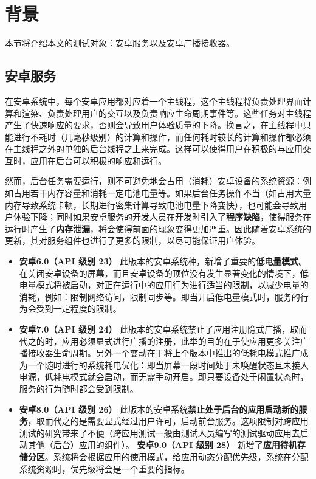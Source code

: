 \chapter{背景}\label{chapter_background}

本节将介绍本文的测试对象：安卓服务以及安卓广播接收器。
\section{安卓服务}

在安卓系统中，每个安卓应用都对应着一个主线程，这个主线程将负责处理界面计算和渲染、负责处理用户的交互以及负责响应生命周期事件等。这些任务对主线程产生了快速响应的要求，否则会导致用户体验质量的下降。换言之，在主线程中只能进行不耗时（几毫秒级别）的计算和操作，而任何耗时较长的计算和操作都必须在主线程之外的单独的后台线程之上来完成。这样可以使得用户在积极的与应用交互时，应用在后台可以积极的响应和运行。

然而，后台任务需要运行，则不可避免地会占用（消耗）安卓设备的系统资源：例如占用若干内存容量和消耗一定电池电量等。如果后台任务操作不当（如占用大量内存导致系统卡顿，长期进行密集计算导致电池电量下降变快），也可能会导致用户体验下降；同时如果安卓服务的开发人员在开发时引入了\textbf{程序缺陷}，使得服务在运行时产生了\textbf{内存泄漏}，将会使得前面的现象变得更加严重。因此随着安卓系统的更新，其对服务组件也进行了更多的限制，以尽可能保证用户体验。

\begin{itemize}
	\item \textbf{安卓6.0（API 级别 23） } 此版本的安卓系统种，新增了重要的\textbf{低电量模式}。在关闭安卓设备的屏幕，而且安卓设备的顶位没有发生显著变化的情境下，低电量模式将被启动，对正在运行中的应用行为进行适当的限制，以减少电量的消耗，例如：限制网络访问，限制同步等。即当开启低电量模式时，服务的行为会受到一定程度的限制。
	\item \textbf{安卓7.0（API 级别 24）} 此版本的安卓系统禁止了应用注册隐式广播，取而代之的时，应用必须显式进行广播的注册，此举的目的在于使应用更多关注广播接收器生命周期。另外一个变动在于将上个版本中推出的低耗电模式推广成为一个随时进行的系统耗电优化：即当屏幕一段时间处于未唤醒状态且未接入电源，低耗电模式就会启动，而无需手动开启。即只要设备处于闲置状态时，服务的行为随时都会受到限制。
	\item \textbf{安卓8.0（API 级别 26）} 此版本的安卓系统\textbf{禁止处于后台的应用启动新的服务}，取而代之的是需要显式经过用户许可，启动前台服务。这项限制对跨应用测试的研究带来了不便（跨应用测试一般由测试人员编写的测试驱动应用去启动其他（后台）应用的组件）。
	\textbf{安卓9.0（API 级别 28）} 新增了\textbf{应用待机存储分区}。系统将会根据应用的使用模式，给应用动态分配优先级，系统在分配系统资源时，优先级将会是一个重要的指标。
\end{itemize}

